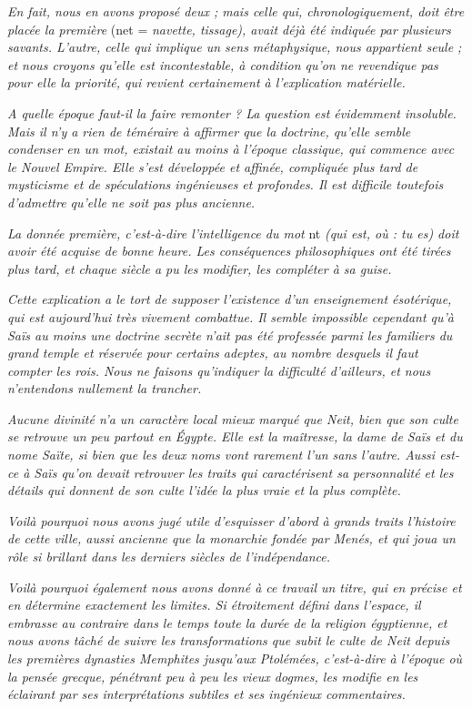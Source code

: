 \documentclass[letterpaper,twocolumn,openany,nodeprecatedcode]{dndbook}
\begin{document}
\emph{En fait, nous en avons proposé deux ; mais celle qui, chronologiquement, doit être placée la première} (net = \emph{navette, tissage), avait déjà été indiquée par plusieurs savants. L'autre, celle qui implique un sens métaphysique, nous appartient seule ; et nous croyons qu'elle est incontestable, à condition qu'on ne revendique pas pour elle la priorité, qui revient certainement à l'explication matérielle.}

\emph{A quelle époque faut-il la faire remonter ? La question est évidemment insoluble. Mais il n'y a rien de téméraire à affirmer que la doctrine, qu'elle semble condenser en un mot, existait au moins à l'époque classique, qui commence avec le Nouvel Empire. Elle s'est développée et affinée, compliquée plus tard de mysticisme et de spéculations ingénieuses et profondes. Il est difficile toutefois d'admettre qu'elle ne soit pas plus ancienne.}

\emph{La donnée première, c'est-à-dire l'intelligence du mot} nt \emph{(qui est, où : tu es) doit avoir été acquise de bonne heure. Les conséquences philosophiques ont été tirées plus tard, et chaque siècle a pu les modifier, les compléter à sa guise.}

\emph{Cette explication a le tort de supposer l'existence d'un enseignement ésotérique, qui est aujourd'hui très vivement combattue. Il semble impossible cependant qu'à Saïs au moins
une doctrine secrète n'ait pas été professée parmi les familiers du grand temple et réservée pour certains adeptes, au nombre desquels il faut compter les rois. Nous ne faisons qu'indiquer la difficulté d'ailleurs, et nous n'entendons nullement la trancher.}

\emph{Aucune divinité n'a un caractère local mieux marqué que Neit, bien que son culte se retrouve un peu partout en Égypte. Elle est la maîtresse, la dame de Saïs et du nome Saïte, si bien que les deux noms vont rarement l'un sans l'autre. Aussi est-ce à Saïs qu'on devait retrouver les traits qui caractérisent sa personnalité et les détails qui donnent de son culte l'idée la plus vraie et la plus complète.}

\emph{Voilà pourquoi nous avons jugé utile d'esquisser d'abord à grands traits l'histoire de cette ville, aussi ancienne que la monarchie fondée par Menés, et qui joua un rôle si brillant dans les derniers siècles de l'indépendance.}

\emph{Voilà pourquoi également nous avons donné à ce travail un titre, qui en précise et en détermine exactement les limites. Si étroitement défini dans l'espace, il embrasse au contraire dans le temps toute la durée de la religion égyptienne, et nous avons tâché de suivre les transformations que subit le culte de Neit depuis les premières dynasties Memphites jusqu'aux Ptolémées, c'est-à-dire à l'époque où la pensée grecque, pénétrant peu à peu les vieux dogmes, les modifie en les éclairant par ses interprétations subtiles et ses ingénieux commentaires.}
\end{document}
